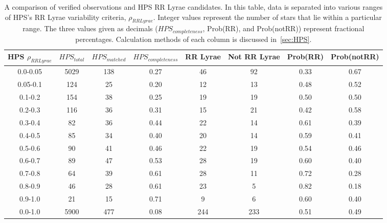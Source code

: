 \documentclass[aps,prb,twocolumn,superscriptaddress]{revtex4-1}
\begin{document}
\begin{table}
	\begin{center}
		\begin{tabular}{|c|c|c|c|c|c|c|c|}\hline
HPS $\rho_{RRLyrae}$ & $HPS_{total}$ & $HPS_{matched}$ & $HPS_{completeness}$ & RR Lyrae & Not RR Lyrae & Prob(RR) & Prob(notRR) \\ \hline
0.0-0.05 & 5029 & 138 	& 0.27 & 46 		& 92 & 0.33 & 0.67 \\ \hline
0.05-0.1 & 124 	& 25 	& 0.20 & 12 		& 13 & 0.48 & 0.52 \\ \hline
0.1-0.2 & 154 	& 38 	& 0.25 & 19 		& 19 & 0.50 & 0.50 \\ \hline
0.2-0.3 & 116 	& 36 	& 0.31 & 15 		& 21 & 0.42 & 0.58 \\ \hline
0.3-0.4 & 82 	& 36 	& 0.44 & 22 		& 14 & 0.61 & 0.39 \\ \hline
0.4-0.5 & 85 	& 34 	& 0.40 & 20		& 14 & 0.59 & 0.41 \\ \hline
0.5-0.6 & 90 	& 41 	& 0.46 & 22		& 19 & 0.54 & 0.46 \\ \hline
0.6-0.7 & 89 	& 47 	& 0.53 & 28		& 19 & 0.60 & 0.40 \\ \hline
0.7-0.8 & 64 	& 39 	& 0.61 & 28 		& 11 & 0.72 & 0.28 \\ \hline
0.8-0.9 & 46 	& 28 	& 0.61& 23 		& 5 & 0.82 & 0.18 \\ \hline
0.9-1.0 & 21 	& 15 	& 0.71 & 9			& 6 & 0.60 & 0.40 \\ \hline
\hline
0.0-1.0 & 5900 & 477 & 0.08 & 244 & 233 & 0.51 & 0.49  \\ \hline
		\end{tabular}
	\end{center}
\caption{ \small{A comparison of verified observations and HPS RR Lyrae candidates. In this table, data is separated into various ranges of HPS's RR Lyrae variability criteria, $\rho_{RRLyrae}$.  Integer values represent the number of stars that lie within a particular range.  The three values given as decimals ($HPS_{completeness}$, Prob(RR), and Prob(notRR)) represent fractional percentages.  Calculation methods of each column is discussed in~\cref{sec:HPS}.\label{tab:HPSlim15}}}
\end{table}

\end{document}
